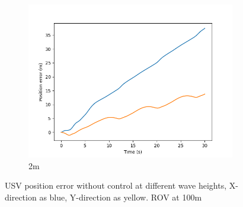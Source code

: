 \documentclass[class=article, crop=false]{standalone}
\begin{document}
\begin{figure}
\begin{subfigure}[b]{0.48\textwidth}
        \includegraphics{scenario1/rov-100m/2.0m/usv_pos_error_uncontrolled}
        \caption{2m}
        \label{}
    \end{subfigure}
    \caption{USV position error without control at different wave heights, X-direction as blue, Y-direction as yellow. ROV at 100m}
    \label{}
\end{figure}
\FloatBarrier
\end{document}
